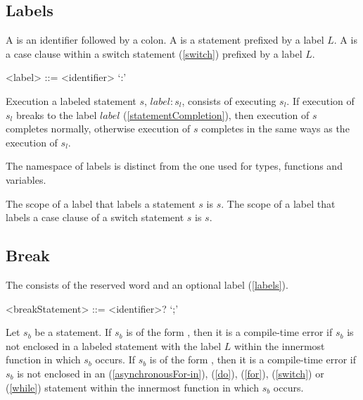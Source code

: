 \documentclass[makeidx]{article}
\begin{document}
{\subsection{Labels}

\LMHash{}%
A  is an identifier followed by a colon.
A  is a statement prefixed by a label $L$.
A  is a case clause within a switch statement
(\ref{switch})
prefixed by a label $L$.


\begin{grammar}
<label> ::= <identifier> `:'
\end{grammar}

\LMHash{}%
Execution a labeled statement $s$, $label: s_l$, consists of executing $s_l$.
If execution of $s_l$ breaks to the label $label$ (\ref{statementCompletion}),
then execution of $s$ completes normally,
otherwise execution of $s$ completes in the same ways as the execution of $s_l$.

\LMHash{}%
The namespace of labels is distinct from the one used for
types, functions and variables.

\LMHash{}%
The scope of a label that labels a statement $s$ is $s$.
The scope of a label that labels a case clause of a switch statement $s$ is $s$.



\subsection{Break}

\LMHash{}%
The  consists of
the reserved word \BREAK{} and an optional label (\ref{labels}).

\begin{grammar}
<breakStatement> ::= \BREAK{} <identifier>? `;'
\end{grammar}

\LMHash{}%
Let $s_b$ be a \BREAK{} statement.
If $s_b$ is of the form ,
then it is a compile-time error if $s_b$ is not enclosed in a labeled statement
with the label $L$ within the innermost function in which $s_b$ occurs.
If $s_b$ is of the form \code{\BREAK;},
then it is a compile-time error if $s_b$ is not enclosed in an
\code{\AWAIT{} \FOR} (\ref{asynchronousFor-in}),
\DO{} (\ref{do}), \FOR{} (\ref{for}), \SWITCH{} (\ref{switch})
or \WHILE{} (\ref{while}) statement within
the innermost function in which $s_b$ occurs.

}
\end{document}
